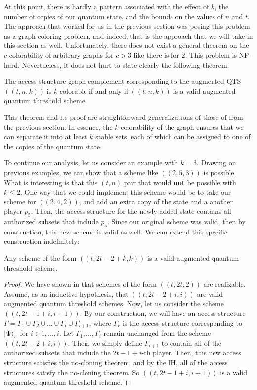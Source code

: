 At this point, there is hardly a pattern associated with the effect of $k$, the number of copies of our quantum state, and the bounds on the values of $n$ and $t$. The approach that worked for us in the previous section was posing this problem as a graph coloring problem, and indeed, that is the approach that we will take in this section as well. Unfortunately, there does not exist a general theorem on the $c$-colorability of arbitrary graphs for $c > 3$ like there is for $2$. This problem is NP-hard. Nevertheless, it does not hurt to state clearly the following theorem:

\begin{lemma}
    \label{lem:k-color-access}
    The access structure graph complement corresponding to the augmented QTS $((t,n,k))$ is $k$-colorable if and only if $((t,n,k))$ is a valid augmented quantum threshold scheme.
\end{lemma}

This theorem and its proof are straightforward generalizations of those of  from the previous section. In essence, the $k$-colorability of the graph ensures that we can separate it into at least $k$ stable sets, each of which can be assigned to one of the copies of the quantum state.

To continue our analysis, let us consider an example with $k=3$. Drawing on previous examples, we can show that a scheme like $((2,5,3))$ is possible. What is interesting is that this $(t,n)$ pair that would \textbf{not} be possible with $k \leq 2$. One way that we could implement this scheme would be to take our scheme for $((2,4,2))$, and add an extra copy of the state and a another player $p_5$. Then, the access structure for the newly added state contains all authorized subsets that include $p_5$. Since our original scheme was valid, then by construction, this new scheme is valid as well. We can extend this specific construction indefinitely:

\begin{theorem}
    \label{thm:build-scheme} 
    Any scheme of the form $((t,2t-2+k,k))$ is a valid augmented quantum threshold scheme.
\end{theorem}

\begin{proof}
    We have shown in  that schemes of the form $((t, 2t, 2))$ are realizable. Assume, as an inductive hypothesis, that $((t, 2t - 2 + i, i))$ are valid augmented quantum threshold schemes. Now, let us consider the scheme $((t, 2t-1+i, i+1))$. By our construction, we will have an access structure $\Gamma = \Gamma_1 \cup \Gamma_2 \cup ... \cup \Gamma_i \cup \Gamma_{i+1}$, where $\Gamma_r$ is the access structure corresponding to $\ket{\Psi}_r$ for $i \in {1,...,i}$. Let $\Gamma_1, ..., \Gamma_i$ remain unchanged from the scheme $((t, 2t - 2 + i, i))$. Then, we simply define $\Gamma_{i+1}$ to contain all of the authorized subsets that include the $2t-1+i$-th player. Then, this new access structure satisfies the no-cloning theorem, and by the IH, all of the access structures satisfy the no-cloning theorem. So $((t, 2t-1+i, i+1))$ is a valid augmented quantum threshold scheme.
\end{proof}

